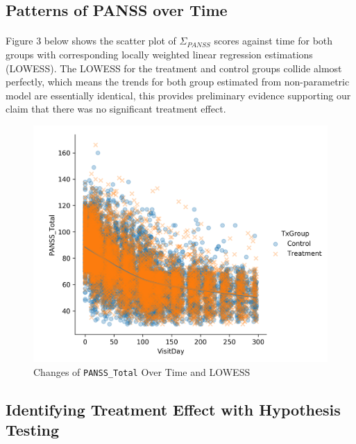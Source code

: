 \documentclass[11pt]{article}
\begin{document}
	\subsection{Patterns of PANSS over Time}
	\paragraph{}Figure 3 below shows the scatter plot of $\Sigma_{PANSS}$ scores against time for both groups with corresponding locally weighted linear regression estimations (LOWESS). The LOWESS for the treatment and control groups collide almost perfectly, which means the trends for both group estimated from non-parametric model are essentially identical, this provides preliminary evidence supporting our claim that there was no significant treatment effect.
	\begin{figure}[H]
		\centering
		\includegraphics[width=0.7\linewidth]{figures/lwlm_te_PANSS_Total.png}
		\caption{Changes of \texttt{PANSS\_Total} Over Time and LOWESS}
	\end{figure}
	\subsection{Identifying Treatment Effect with Hypothesis Testing}
\end{document}
